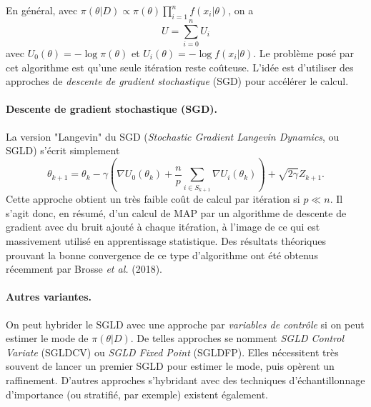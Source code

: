 En général, avec $\pi(\theta|D) \propto \pi(\theta) \prod\limits_{i=1}^n f(x_i | \theta)$, on a
$$
U  = \sum\limits_{i=0}^n U_i
$$
avec $U_0(\theta)=-\log \pi(\theta)$ et $U_i(\theta) = -\log f(x_i | \theta)$. Le problème posé par cet algorithme est qu'une seule itération reste coûteuse.  L'idée est d'utiliser des approches de \emph{descente de gradient stochastique} (SGD) pour accélérer le calcul. \\

\paragraph{Descente de gradient stochastique (SGD).} La version "Langevin" du SGD ({\it Stochastic Gradient Langevin Dynamics}, ou SGLD) s'écrit simplement 
$$
\theta_{k+1} = \theta_k -  \gamma\left(\nabla U_0(\theta_k) + \frac{n}{p}\sum\limits_{i\in S_{k+1}}\nabla U_i(\theta_k)\right)  + \sqrt{2\gamma} Z_{k+1}.
$$
Cette approche obtient un très faible coût de calcul par itération si $p\ll n$. Il s'agit donc, en résumé, d'un calcul de MAP par un algorithme de descente de gradient avec du bruit ajouté à chaque itération, à l'image de ce qui est massivement utilisé en apprentissage statistique. Des résultats théoriques prouvant la bonne convergence de ce type d'algorithme ont été obtenus récemment par Brosse {\it et al.} (2018). \\

\paragraph{Autres variantes.} On peut hybrider le SGLD avec une approche par \emph{variables de contrôle} si on peut estimer  le mode  de $\pi(\theta|D)$. De telles approches se nomment \emph{SGLD Control Variate} (SGLDCV) ou \emph{SGLD Fixed Point} (SGLDFP). Elles nécessitent très souvent de lancer un premier SGLD pour estimer le mode, puis opèrent un raffinement. D'autres approches s'hybridant avec des techniques d'échantillonnage d'importance (ou stratifié, par exemple) existent également.  


